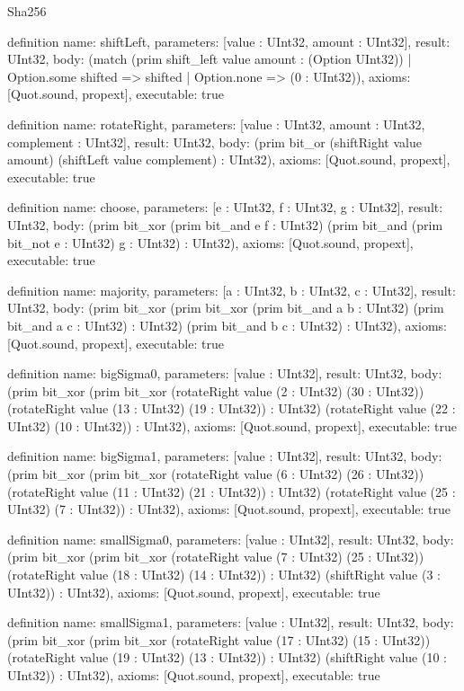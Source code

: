 \begin{lexlean}{Sha256}
\begin{semanticmodule}
definition{
  name: shiftLeft,
  parameters: [value : UInt32, amount : UInt32],
  result: UInt32,
  body: (match (prim shift_left value amount : (Option UInt32))
    | Option.some shifted => shifted
    | Option.none => (0 : UInt32)),
  axioms: [Quot.sound, propext],
  executable: true
}

definition{
  name: rotateRight,
  parameters: [value : UInt32, amount : UInt32, complement : UInt32],
  result: UInt32,
  body: (prim bit_or (shiftRight value amount) (shiftLeft value complement) : UInt32),
  axioms: [Quot.sound, propext],
  executable: true
}

definition{
  name: choose,
  parameters: [e : UInt32, f : UInt32, g : UInt32],
  result: UInt32,
  body: (prim bit_xor (prim bit_and e f : UInt32) (prim bit_and (prim bit_not e : UInt32) g : UInt32) : UInt32),
  axioms: [Quot.sound, propext],
  executable: true
}

definition{
  name: majority,
  parameters: [a : UInt32, b : UInt32, c : UInt32],
  result: UInt32,
  body: (prim bit_xor (prim bit_xor (prim bit_and a b : UInt32) (prim bit_and a c : UInt32) : UInt32) (prim bit_and b c : UInt32) : UInt32),
  axioms: [Quot.sound, propext],
  executable: true
}

definition{
  name: bigSigma0,
  parameters: [value : UInt32],
  result: UInt32,
  body: (prim bit_xor (prim bit_xor (rotateRight value (2 : UInt32) (30 : UInt32)) (rotateRight value (13 : UInt32) (19 : UInt32)) : UInt32) (rotateRight value (22 : UInt32) (10 : UInt32)) : UInt32),
  axioms: [Quot.sound, propext],
  executable: true
}

definition{
  name: bigSigma1,
  parameters: [value : UInt32],
  result: UInt32,
  body: (prim bit_xor (prim bit_xor (rotateRight value (6 : UInt32) (26 : UInt32)) (rotateRight value (11 : UInt32) (21 : UInt32)) : UInt32) (rotateRight value (25 : UInt32) (7 : UInt32)) : UInt32),
  axioms: [Quot.sound, propext],
  executable: true
}

definition{
  name: smallSigma0,
  parameters: [value : UInt32],
  result: UInt32,
  body: (prim bit_xor (prim bit_xor (rotateRight value (7 : UInt32) (25 : UInt32)) (rotateRight value (18 : UInt32) (14 : UInt32)) : UInt32) (shiftRight value (3 : UInt32)) : UInt32),
  axioms: [Quot.sound, propext],
  executable: true
}

definition{
  name: smallSigma1,
  parameters: [value : UInt32],
  result: UInt32,
  body: (prim bit_xor (prim bit_xor (rotateRight value (17 : UInt32) (15 : UInt32)) (rotateRight value (19 : UInt32) (13 : UInt32)) : UInt32) (shiftRight value (10 : UInt32)) : UInt32),
  axioms: [Quot.sound, propext],
  executable: true
}


\end{semanticmodule}
\end{lexlean}
